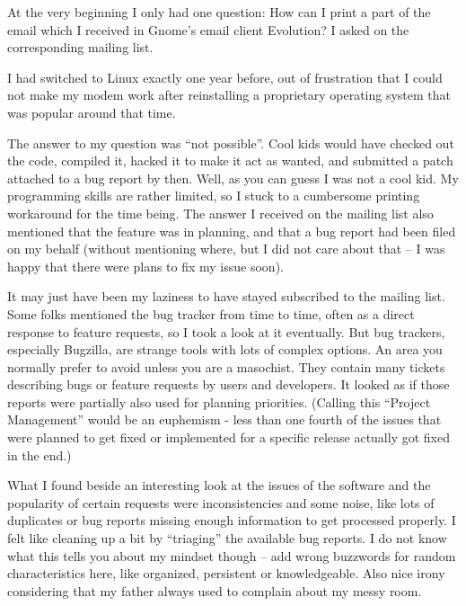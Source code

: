 

\noindent{}At the very beginning I only had one question: How can I print a part of the
email which I received in Gnome's email client Evolution? I asked on the
corresponding mailing list.

I had switched to Linux exactly one year before, out of frustration that I
could not make my modem work after reinstalling a proprietary operating system
that was popular around that time.

The answer to my question was ``not possible''. Cool kids would have checked out
the code, compiled it, hacked it to make it act as wanted, and submitted a patch
attached to a bug report by then. Well, as you can guess I was not a cool kid.
My programming skills are rather limited, so I stuck to a cumbersome printing
workaround for the time being. The answer I received on the mailing list also
mentioned that the feature was in planning, and that a bug report had been filed
on my behalf (without mentioning where, but I did not care about that -- I was
happy that there were plans to fix my issue soon).

It may just have been my laziness to have stayed subscribed to the mailing list.
Some folks mentioned the bug tracker from time to time, often as a direct
response to feature requests, so I took a look at it eventually. But bug
trackers, especially Bugzilla, are strange tools with lots of complex options.
An area you normally prefer to avoid unless you are a masochist. They contain
many tickets describing bugs or feature requests by users and developers. It
looked as if those reports were partially also used for planning priorities.
(Calling this ``Project Management'' would be an euphemism - less than one
fourth of the issues that were planned to get fixed or implemented for a
specific release actually got fixed in the end.)

What I found beside an interesting look at the issues of the software and the
popularity of certain requests were inconsistencies and some noise, like lots of
duplicates or bug reports missing enough information to get processed properly.
I felt like cleaning up a bit by ``triaging'' the available bug reports. I do
not know what this tells you about my mindset though -- add wrong buzzwords for
random characteristics here, like organized, persistent or knowledgeable. Also
nice irony considering that my father always used to complain about my messy
room.

